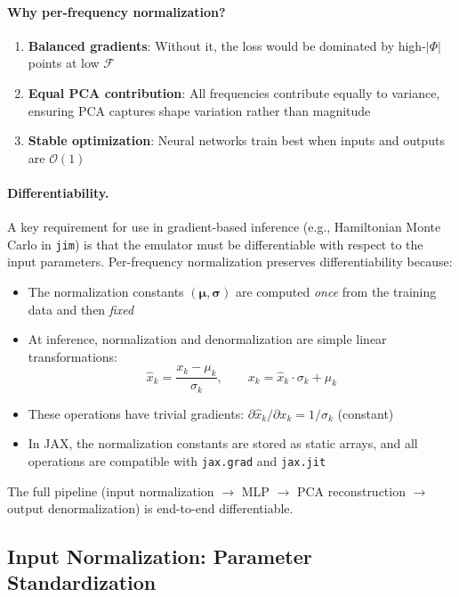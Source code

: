 \documentclass[11pt,a4paper]{article}
\newcommand{\Mf}{\mathcal{F}}
\begin{document}
\paragraph{Why per-frequency normalization?}
\begin{enumerate}
    \item \textbf{Balanced gradients}: Without it, the loss would be dominated by high-$|\Phi|$ points at low $\Mf$
    \item \textbf{Equal PCA contribution}: All frequencies contribute equally to variance, ensuring PCA captures shape variation rather than magnitude
    \item \textbf{Stable optimization}: Neural networks train best when inputs and outputs are $\mathcal{O}(1)$
\end{enumerate}

\paragraph{Differentiability.}
A key requirement for use in gradient-based inference (e.g., Hamiltonian Monte Carlo in \texttt{jim}) is that the emulator must be differentiable with respect to the input parameters. Per-frequency normalization preserves differentiability because:
\begin{itemize}
    \item The normalization constants $(\bm{\mu}, \bm{\sigma})$ are computed \emph{once} from the training data and then \emph{fixed}
    \item At inference, normalization and denormalization are simple linear transformations:
    \begin{equation}
        \hat{x}_k = \frac{x_k - \mu_k}{\sigma_k}, \qquad x_k = \hat{x}_k \cdot \sigma_k + \mu_k
    \end{equation}
    \item These operations have trivial gradients: $\partial \hat{x}_k / \partial x_k = 1/\sigma_k$ (constant)
    \item In JAX, the normalization constants are stored as static arrays, and all operations are compatible with \texttt{jax.grad} and \texttt{jax.jit}
\end{itemize}
The full pipeline (input normalization $\to$ MLP $\to$ PCA reconstruction $\to$ output denormalization) is end-to-end differentiable.

\subsection{Input Normalization: Parameter Standardization}
\end{document}
